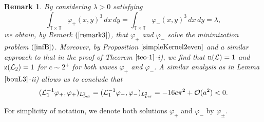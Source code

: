 \documentclass[12pt,reqno,a4paper]{amsart} %
\numberwithin{equation}{section}
\numberwithin{figure}{section}
\newtheorem{remark}[theorem]{Remark}
\begin{document}
\begin{remark}\label{remsol+-} By considering \(\lambda > 0\) satisfying 
\begin{equation}\label{cond1}
	\int_{\mathbb{T}\times\mathbb{T}}\varphi_{+}(x,y)^3 \, dx \, dy = \int_{\mathbb{T}\times\mathbb{T}}\varphi_{-}(x,y)^3 \, dx \, dy =  \lambda,
\end{equation}
we obtain, by Remark $(\ref{remark3})$, that \(\varphi_{+}\) and \(\varphi_{-}\) solve the minimization problem \((\ref{infB})\). Moreover, by Proposition \(\ref{simpleKernel2even}\) and a similar approach to that in the proof of Theorem \(\ref{teo-1}\)-i), we find that \({\rm n}(\mathcal{L}) = 1\) and \({\rm z}(\mathcal{L}_2) = 1\) for \(c \sim 2^{+}\) for both waves \(\varphi_{+}\) and \(\varphi_{-}\). A similar analysis as in Lemma \(\ref{bouL3}\)-ii) allows us to conclude that 
\begin{equation}\label{derc121}
	(\mathcal{L}_1^{-1}\varphi_{+},\varphi_{+})_{L_{\rm per}^2} = (\mathcal{L}_1^{-1}\varphi_{-},\varphi_{-})_{L_{\rm per}^2} = -16c\pi^2 + \mathcal{O}(a^2) < 0.
\end{equation}
\end{remark}
\indent For simplicity of notation, we denote both solutions $\varphi_+$ and $\varphi_-$ by $\varphi_{\pm}$.
\end{document}

